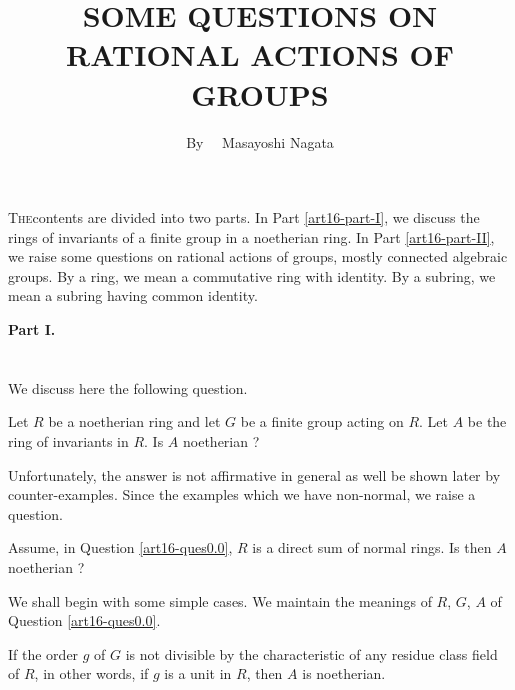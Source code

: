 \title{SOME QUESTIONS ON RATIONAL ACTIONS OF GROUPS}

\author{By~~ Masayoshi Nagata}
\date{}

\maketitle

\setcounter{pageoriginal}{322}
\textsc{The}\pageoriginale contents are divided into two parts. In Part \ref{art16-part-I}, we discuss the rings of invariants of a finite group in a noetherian ring. In Part \ref{art16-part-II}, we raise some questions on rational actions of groups, mostly connected algebraic groups. By a ring, we mean a commutative ring with identity. By a subring, we mean a subring having common identity.

\bigskip
\begin{center}
{\bf\Large Part I.}
\end{center}

\setcounter{section}{-1}
\section{} We discuss here the following question.

\setcounter{proposition}{-1}
\begin{question}\label{art16-ques0.0}
Let $R$ be a noetherian ring and let $G$ be a finite group acting on $R$. Let $A$ be the ring of invariants in $R$. Is $A$ noetherian ?
\end{question}

Unfortunately, the answer is not affirmative in general as well be shown later by counter-examples. Since the examples which we have non-normal, we raise a question.

\begin{question}\label{art16-ques0.1}
Assume, in Question \ref{art16-ques0.0}, $R$ is a direct sum of normal rings. Is then $A$ noetherian ?
\end{question}

We shall begin with some simple cases. We maintain the meanings of $R$, $G$, $A$ of Question \ref{art16-ques0.0}.

\begin{proposition}\label{art16-prop0.2}
If the order $g$ of $G$ is not divisible by the characteristic of any residue class field of $R$, in other words, if $g$ is a unit in $R$, then $A$ is noetherian.
\end{proposition}

